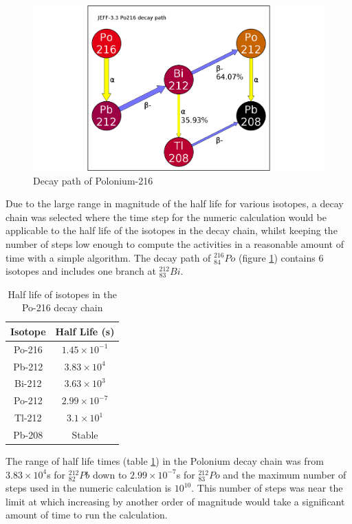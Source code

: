 \begin{figure}[h]
  \begin{center}
    \includegraphics[width=0.6\linewidth]{chapters/activity_code/84po216/84Po216_path1.png}
    \caption{Decay path of Polonium-216}
    \label{fig:DecayPathPo216}
  \end{center}
\end{figure}

Due to the large range in magnitude of the half life for various isotopes, a decay chain was selected where the time step for the numeric calculation would be applicable to the half life of the isotopes in the decay chain, whilst keeping the number of steps low enough to compute the activities in a reasonable amount of time with a simple algorithm.  The decay path of  ${}^{216}_{84}Po$ (figure \ref{fig:DecayPathPo216}) contains 6 isotopes and includes one branch at ${}^{212}_{83}Bi$.

\begin{table}[h]
\begin{center}
\begin{tabular}{c c}
\hline\hline
Isotope & Half Life (s)\\
\hline\hline
Po-216 & $1.45 \times 10^{-1}$ \\
Pb-212 & $3.83 \times 10^{4}$ \\
Bi-212 & $3.63 \times 10^{3}$ \\
Po-212 & $2.99 \times 10^{-7}$ \\
Tl-212 & $3.1 \times 10^{1}$ \\
Pb-208 & Stable \\
\hline\hline
\end{tabular}
\end{center}
\caption{Half life of isotopes in the Po-216 decay chain}
\label{table:po216halflives}
\end{table}

The range of half life times (table \ref{table:po216halflives}) in the Polonium decay chain was from $3.83 \times 10^4$s for ${}^{212}_{82}Pb$ down to $2.99 \times 10^{-7}$s for ${}^{212}_{83}Po$ and the maximum number of steps used in the numeric calculation is $10^{10}$.  This number of steps was near the limit at which increasing by another order of magnitude would take a significant amount of time to run the calculation. 

